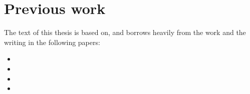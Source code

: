 \section{Previous work}

The text of this thesis is based on, and borrows heavily from the work and the
writing in the following papers:

\begin{itemize}
\item {}
\item {}
\item {}
\item {}
\end{itemize}
